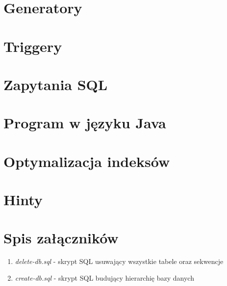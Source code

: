 \documentclass[11pt,a4paper]{article}
\begin{document}
\section{Generatory}

\section{Triggery}

\section{Zapytania SQL}

\section{Program w języku Java}

\section{Optymalizacja indeksów}

\section{Hinty}


\section*{Spis załączników}
\begin{enumerate}[label=\arabic*,ref=\arabic*]
\item \label{attach:create-db} \textit{delete-db.sql} - skrypt SQL usuwający wszystkie tabele oraz sekwencje
\item \label{attach:delete-db} \textit{create-db.sql} - skrypt SQL budujący hierarchię bazy danych
\end{enumerate}
\end{document}
